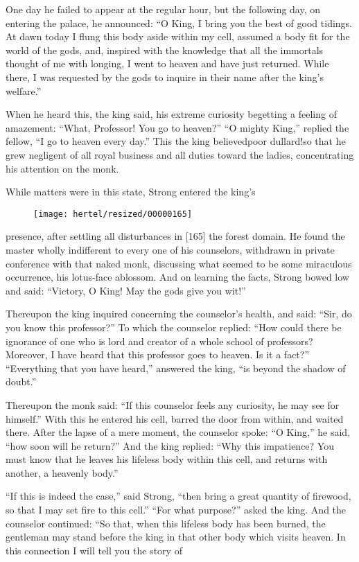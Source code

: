 \documentclass[article, twoside, 10pt]{memoir}
\begin{document}
One day he failed to appear at the regular hour, but the following
day, on entering the palace, he announced:
``O King, I bring you the best of good tidings. At dawn today I flung this body aside within my cell, assumed a body fit for the world of the gods, and, inspired with the knowledge that all the immortals thought of me with longing, I went to heaven and have just returned. While there, I was requested by the gods to inquire in their name after the king's welfare.''

When he heard this, the king said, his extreme curiosity begetting
a feeling of amazement: ``What, Professor! You go to heaven?''
``O mighty King,'' replied the fellow,
``I go to heaven every day.'' This the king believed{\textemdash}poor
dullard!{\textemdash}so that he grew negligent of all royal business and all
duties toward the ladies, concentrating his attention on the monk.

While matters were in this state, Strong entered the king's
\begin{figure}[p]\texttt{[image: hertel/resized/00000165]}\end{figure}presence, after settling all disturbances in [165] the forest
domain. He found the master wholly indifferent to every one of his
counselors, withdrawn in private conference with that naked monk,
discussing what seemed to be some miraculous occurrence, his
lotus-face ablossom. And on learning the facts, Strong bowed low
and said: ``Victory, O King! May the gods give you wit!''

Thereupon the king inquired concerning the counselor's health, and
said: ``Sir, do you know this professor?'' To which the counselor
replied:
``How could there be ignorance of one who is lord and creator of a whole school of professors? Moreover, I have heard that this professor goes to heaven. Is it a fact?''
``Everything that you have heard,'' answered the king,
``is beyond the shadow of doubt.''

Thereupon the monk said:
``If this counselor feels any curiosity, he may see for himself.''
With this he entered his cell, barred the door from within, and
waited there. After the lapse of a mere moment, the counselor
spoke: ``O King,'' he said, ``how soon will he return?'' And the
king replied:
``Why this impatience? You must know that he leaves his lifeless body within this cell, and returns with another, a heavenly body.''

``If this is indeed the case,'' said Strong,
``then bring a great quantity of firewood, so that I may set fire to this cell.''
``For what purpose?'' asked the king. And the counselor continued:
“So that, when this lifeless body has been burned, the gentleman
may stand before the king in that other body which visits heaven.
In this connection I will tell you the story of
\end{document}
